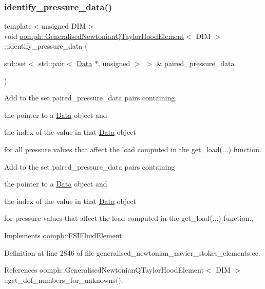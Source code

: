 \subsubsection{\texorpdfstring{identify\+\_\+pressure\+\_\+data()}{identify\_pressure\_data()}}
{\footnotesize\ttfamily template$<$unsigned D\+IM$>$ \\
void \hyperlink{classoomph_1_1GeneralisedNewtonianQTaylorHoodElement}{oomph\+::\+Generalised\+Newtonian\+Q\+Taylor\+Hood\+Element}$<$ D\+IM $>$\+::identify\+\_\+pressure\+\_\+data (\begin{DoxyParamCaption}\item[{std\+::set$<$ std\+::pair$<$ \hyperlink{classoomph_1_1Data}{Data} $\ast$, unsigned $>$ $>$ \&}]{paired\+\_\+pressure\+\_\+data }\end{DoxyParamCaption})\hspace{0.3cm}{\ttfamily [virtual]}}



Add to the set {\ttfamily paired\+\_\+pressure\+\_\+data} pairs containing. 


\begin{DoxyItemize}
\item the pointer to a \hyperlink{classoomph_1_1Data}{Data} object and
\item the index of the value in that \hyperlink{classoomph_1_1Data}{Data} object
\end{DoxyItemize}for all pressure values that affect the load computed in the {\ttfamily get\+\_\+load}(...) function.

Add to the set {\ttfamily paired\+\_\+pressure\+\_\+data} pairs containing
\begin{DoxyItemize}
\item the pointer to a \hyperlink{classoomph_1_1Data}{Data} object and
\item the index of the value in that \hyperlink{classoomph_1_1Data}{Data} object
\end{DoxyItemize}for pressure values that affect the load computed in the {\ttfamily get\+\_\+load}(...) function., 

Implements \hyperlink{classoomph_1_1FSIFluidElement_af8e0805b769b7d111eb71f223fc83df8}{oomph\+::\+F\+S\+I\+Fluid\+Element}.



Definition at line 2846 of file generalised\+\_\+newtonian\+\_\+navier\+\_\+stokes\+\_\+elements.\+cc.



References oomph\+::\+Generalised\+Newtonian\+Q\+Taylor\+Hood\+Element$<$ D\+I\+M $>$\+::get\+\_\+dof\+\_\+numbers\+\_\+for\+\_\+unknowns().



